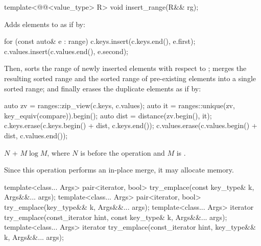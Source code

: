 %
\begin{itemdecl}
template<@@<value_type> R>
  void insert_range(R&& rg);
\end{itemdecl}

\begin{itemdescr}
\pnum
\effects
Adds elements to  as if by:
\begin{codeblock}
for (const auto& e : range) {
  c.keys.insert(c.keys.end(), e.first);
  c.values.insert(c.values.end(), e.second);
}
\end{codeblock}
Then, sorts the range of newly inserted elements
with respect to ;
merges the resulting sorted range and
the sorted range of pre-existing elements into a single sorted range; and
finally erases the duplicate elements as if by:
\begin{codeblock}
auto zv = ranges::zip_view(c.keys, c.values);
auto it = ranges::unique(zv, key_equiv(compare)).begin();
auto dist = distance(zv.begin(), it);
c.keys.erase(c.keys.begin() + dist, c.keys.end());
c.values.erase(c.values.begin() + dist, c.values.end());
\end{codeblock}

\pnum
\complexity
$N$ + $M \log M$,
where $N$ is  before the operation and
$M$ is .

\pnum
\remarks
Since this operation performs an in-place merge, it may allocate memory.
\end{itemdescr}

%
\begin{itemdecl}
template<class... Args>
  pair<iterator, bool> try_emplace(const key_type& k, Args&&... args);
template<class... Args>
  pair<iterator, bool> try_emplace(key_type&& k, Args&&... args);
template<class... Args>
  iterator try_emplace(const_iterator hint, const key_type& k, Args&&... args);
template<class... Args>
  iterator try_emplace(const_iterator hint, key_type&& k, Args&&... args);
\end{itemdecl}

